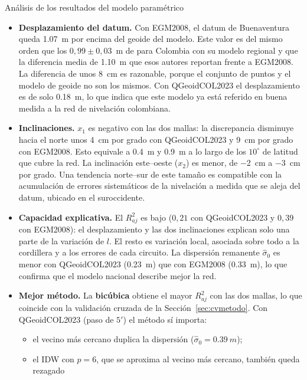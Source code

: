 \documentclass[11pt,letterpaper]{article}
\begin{document}
\begin{analisisBox}{Análisis de los resultados del modelo paramétrico}
\begin{itemize}
    \item \textbf{Desplazamiento del datum.} Con EGM2008, el datum de Buenaventura queda
    \SI{1.07}{m} por encima del geoide del modelo. Este valor es del mismo orden que los
    $0{,}99\pm0{,}03$~m de \citet{guimaraes2025} para Colombia con su modelo regional y que la
    diferencia media de \SI{1.10}{m} que esos autores reportan frente a EGM2008. La diferencia de
    unos \SI{8}{cm} es razonable, porque el conjunto de puntos y el modelo de geoide no son los
    mismos. Con QGeoidCOL2023 el desplazamiento es de solo \SI{0.18}{m}, lo que indica que este
    modelo ya está referido en buena medida a la red de nivelación colombiana.
    \item \textbf{Inclinaciones.} $x_1$ es negativo con las dos mallas: la discrepancia
    disminuye hacia el norte unos \SI{4}{cm} por grado con QGeoidCOL2023 y \SI{9}{cm} por grado
    con EGM2008. Esto equivale a \SI{0.4}{m} y \SI{0.9}{m} a lo largo de los $10^\circ$ de
    latitud que cubre la red. La inclinación este--oeste ($x_2$) es menor, de \SI{-2}{cm} a
    \SI{-3}{cm} por grado. Una tendencia norte--sur de este tamaño es compatible con la
    acumulación de errores sistemáticos de la nivelación a medida que se aleja del datum, ubicado
    en el suroccidente.
    \item \textbf{Capacidad explicativa.} El $R^2_{aj}$ es bajo ($0{,}21$ con QGeoidCOL2023 y
    $0{,}39$ con EGM2008): el desplazamiento y las dos inclinaciones explican solo una parte de
    la variación de $l$. El resto es variación local, asociada sobre todo a la cordillera y a
    los errores de cada circuito. La dispersión remanente $\hat\sigma_0$ es menor con
    QGeoidCOL2023 (\SI{0.23}{m}) que con EGM2008 (\SI{0.33}{m}), lo que confirma que el modelo
    nacional describe mejor la red.
    \item \textbf{Mejor método.} La \textbf{bicúbica} obtiene el mayor $R^2_{aj}$ con las dos
    mallas, lo que coincide con la validación cruzada de la Sección~\ref{sec:cvmetodo}. Con
    QGeoidCOL2023 (paso de $5'$) el método sí importa:
    \begin{itemize}
        \item el vecino más cercano duplica la dispersión ($\hat\sigma_0=\SI{0.39}{m}$);
        \item el IDW con $p=6$, que se aproxima al vecino más cercano, también queda rezagado

\end{itemize}
\end{itemize}
\end{analisisBox}
\end{document}
